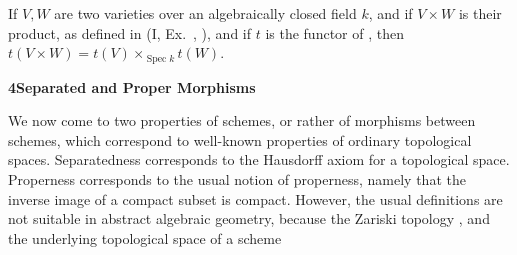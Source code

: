 {{\begin{description}[leftmargin=2.4em,labelindent=0pt,topsep=4pt,itemsep=4pt,parsep=0pt]
\item[\hypertarget{ex-II-3.23}{}\textbf{3.23.}] If $V,W$ are two varieties over an algebraically closed field $k$, and if $V\times W$ is their product, as defined in (I, Ex.~, ), and if $t$ is the functor of , then $t(V\times W)=t(V)\times_{\operatorname{Spec}k}t(W)$.
\end{description}}

\medskip
\noindent\hypertarget{sec-II-4}{}\textbf{\large 4\quad Separated and Proper Morphisms}\par
\smallskip
\noindent We now come to two properties of schemes, or rather of morphisms between schemes, which correspond to well-known properties of ordinary topological spaces. Separatedness corresponds to the Hausdorff axiom for a topological space. Properness corresponds to the usual notion of properness, namely that the inverse image of a compact subset is compact. However, the usual definitions are not suitable in abstract algebraic geometry, because the Zariski topology \hypertarget{err-II-4-Hausdorff}{}, and the underlying topological space of a scheme
}
